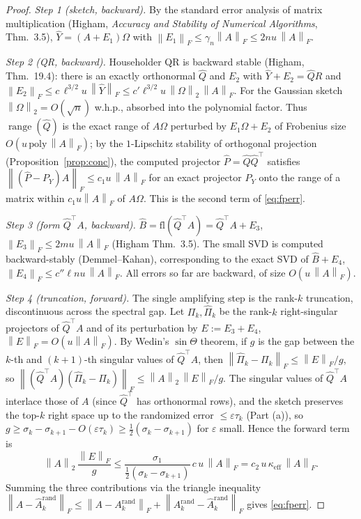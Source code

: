 \documentclass{amsart}
\theoremstyle{definition}
\DeclareMathOperator{\range}{range}
\newcommand{\Frob}[1]{\left\lVert #1\right\rVert_F}
\newcommand{\Op}[1]{\left\lVert #1\right\rVert_2}
\begin{document}
\begin{proof}
\emph{Step 1 (sketch, backward).} By the standard error analysis of matrix
multiplication (Higham, \emph{Accuracy and Stability of Numerical Algorithms},
Thm.~3.5), $\widehat Y=(A+E_1)\Omega$ with $\Frob{E_1}\le\gamma_n\Frob{A}\le
2nu\,\Frob{A}$.

\emph{Step 2 (QR, backward).} Householder QR is backward stable (Higham,
Thm.~19.4): there is an exactly orthonormal $\widehat Q$ and $E_2$ with
$\widehat Y+E_2=\widehat Q R$ and $\Frob{E_2}\le c\,\ell^{3/2}u\,\Frob{\widehat Y}
\le c'\ell^{3/2}u\,\Op{\Omega}\,\Frob{A}$. For the Gaussian sketch
$\Op{\Omega}=O(\sqrt{n})$ w.h.p., absorbed into the polynomial factor. Thus
$\range(\widehat Q)$ is the exact range of $A\Omega$ perturbed by
$E_1\Omega+E_2$ of Frobenius size $O(u\,\mathrm{poly}\,\Frob{A})$; by the
$1$-Lipschitz stability of orthogonal projection (Proposition~\ref{prop:conc}),
the computed projector $\widehat P=\widehat Q\widehat Q^\top$ satisfies
$\Frob{(\widehat P-P_Y)A}\le c_1u\,\Frob{A}$ for an exact projector $P_Y$ onto
the range of a matrix within $c_1u\Frob{A}$ of $A\Omega$. This is the second
term of \eqref{eq:fperr}.

\emph{Step 3 (form $\widehat Q^\top A$, backward).} $\widehat B=\mathrm{fl}(\widehat Q^\top A)
=\widehat Q^\top A+E_3$, $\Frob{E_3}\le2mu\,\Frob{A}$ (Higham Thm.~3.5). The
small SVD is computed backward-stably (Demmel--Kahan), corresponding to the
exact SVD of $\widehat B+E_4$, $\Frob{E_4}\le c''\ell n u\,\Frob{A}$. All errors
so far are backward, of size $O(u\,\Frob{A})$.

\emph{Step 4 (truncation, forward).} The single amplifying step is the rank-$k$
truncation, discontinuous across the spectral gap. Let $\Pi_k,\widehat\Pi_k$ be
the rank-$k$ right-singular projectors of $\widehat Q^\top A$ and of its
perturbation by $E:=E_3+E_4$, $\Frob{E}=O(u\Frob{A})$. By Wedin's
$\sin\Theta$ theorem, if $g$ is the gap between the $k$-th and $(k{+}1)$-th
singular values of $\widehat Q^\top A$, then
$\Frob{\widehat\Pi_k-\Pi_k}\le\Frob{E}/g$, so
$\Frob{(\widehat Q^\top A)(\widehat\Pi_k-\Pi_k)}\le\Op{A}\,\Frob{E}/g$. The
singular values of $\widehat Q^\top A$ interlace those of $A$ (since
$\widehat Q^\top$ has orthonormal rows), and the sketch preserves the top-$k$
right space up to the randomized error $\le\varepsilon\tau_k$ (Part (a)), so
$g\ge\sigma_k-\sigma_{k+1}-O(\varepsilon\tau_k)\ge\tfrac12(\sigma_k-\sigma_{k+1})$
for $\varepsilon$ small. Hence the forward term is
\[
\Op{A}\,\frac{\Frob{E}}{g}\le\frac{\sigma_1}{\tfrac12(\sigma_k-\sigma_{k+1})}
\,c\,u\,\Frob{A}=c_2\,u\,\kappa_{\mathrm{eff}}\,\Frob{A}.
\]
Summing the three contributions via the triangle inequality
$\Frob{A-\widehat A_k^{\mathrm{rand}}}\le\Frob{A-A_k^{\mathrm{rand}}}
+\Frob{A_k^{\mathrm{rand}}-\widehat A_k^{\mathrm{rand}}}$ gives \eqref{eq:fperr}.


\end{proof}
\end{document}
